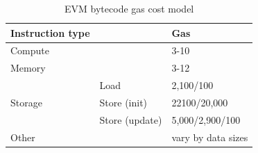\begin{table}[t]
\caption{EVM bytecode gas cost model}
\label{tab:gas-model}
\vspace{-1em}
    \centering
        \footnotesize
    \begin{tabular}{ll|l}
    \hline
\textbf{Instruction type}        &                          & \textbf{Gas}                \\
    \hline
Compute                  &                          & 3-10               \\
    \hline
Memory                   &                          & 3-12                  \\
    \hline
\multirow{3}{*}{Storage} & Load                     & 2,100/100              \\
                         & Store (init)             & 22100/20,000             \\
                         & Store (update)           & 5,000/2,900/100              \\
    \hline
Other                    &                          & vary by data sizes \\
    \hline
\end{tabular}
\vspace{-1.2em}
\end{table}